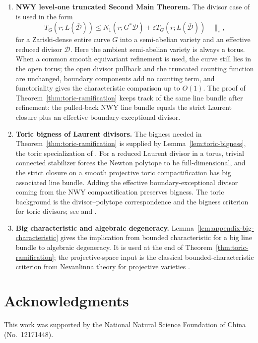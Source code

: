 \documentclass[11pt]{amsart}
\numberwithin{equation}{section}
\theoremstyle{definition}
\theoremstyle{remark}
\begin{document}
\begin{enumerate}[label=\textup{(E\arabic*)}]
\item \textbf{NWY level-one truncated Second Main Theorem.}
The divisor case of \cite[Main Theorem~(iii)]{NoguchiWinkelmannYamanoi2008SMTII} is used in the form
\[
T_G(r;L(\overline{\mathcal D}))
\le
N_1(r;G^*\mathcal D)
+
\varepsilon T_G(r;L(\overline{\mathcal D}))
\quad \|_\varepsilon,
\]
for a Zariski-dense entire curve $G$ into a semi-abelian variety and an effective reduced divisor $\mathcal D$.  Here the ambient semi-abelian variety is always a torus.  When a common smooth equivariant refinement is used, the curve still lies in the open torus; the open divisor pullback and the truncated counting function are unchanged, boundary components add no counting term, and functoriality gives the characteristic comparison up to $O(1)$.  The proof of Theorem~\ref{thm:toric-ramification} keeps track of the same line bundle after refinement: the pulled-back NWY line bundle equals the strict Laurent closure plus an effective boundary-exceptional divisor.

\item \textbf{Toric bigness of Laurent divisors.}
The bigness needed in Theorem~\ref{thm:toric-ramification} is supplied by Lemma~\ref{lem:toric-bigness}, the toric specialization of \cite[Proposition~3.9(ii)]{NoguchiWinkelmannYamanoi2008SMTII}.  For a reduced Laurent divisor in a torus, trivial connected stabilizer forces the Newton polytope to be full-dimensional, and the strict closure on a smooth projective toric compactification has big associated line bundle.  Adding the effective boundary-exceptional divisor coming from the NWY compactification preserves bigness.  The toric background is the divisor--polytope correspondence and the bigness criterion for toric divisors; see \cite[\S~3.4]{Fulton1993Toric} and \cite[Proposition~4.3.3 and Ch.~9]{CoxLittleSchenck2011Toric}.

\item \textbf{Big characteristic and algebraic degeneracy.}
Lemma~\ref{lem:appendix-big-characteristic} gives the implication from bounded characteristic for a big line bundle to algebraic degeneracy.  It is used at the end of Theorem~\ref{thm:toric-ramification}; the projective-space input is the classical bounded-characteristic criterion from Nevanlinna theory for projective varieties \cite{GriffithsKing1973Nevanlinna,NoguchiWinkelmann2014Nevanlinna}.
\end{enumerate}

\section*{Acknowledgments}
This work was supported by the National Natural Science Foundation of China (No.~12171448).
\end{document}
